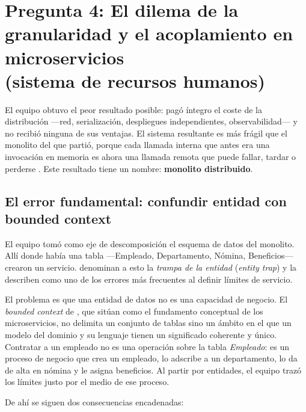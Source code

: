 \section[Pregunta 4: Granularidad y acoplamiento]{Pregunta 4: El dilema de la granularidad y el acoplamiento en microservicios\\(sistema de recursos humanos)}


El equipo obtuvo el peor resultado posible: pagó íntegro el coste de la distribución ---red, serialización, despliegues independientes, observabilidad--- y no recibió ninguna de sus ventajas. El sistema resultante es más frágil que el monolito del que partió, porque cada llamada interna que antes era una invocación en memoria es ahora una llamada remota que puede fallar, tardar o perderse \parencite{richardsford2020}. Este resultado tiene un nombre: \textbf{monolito distribuido}.

\subsection{El error fundamental: confundir entidad con bounded context}

El equipo tomó como eje de descomposición el esquema de datos del monolito. Allí donde había una tabla ---Empleado, Departamento, Nómina, Beneficios--- crearon un servicio. \textcite{fordhardparts2021} denominan a esto la \emph{trampa de la entidad} (\emph{entity trap}) y la describen como uno de los errores más frecuentes al definir límites de servicio.

El problema es que una entidad de datos no es una capacidad de negocio. El \emph{bounded context} de \textcite{evans2003}, que \textcite{richardsford2020} sitúan como el fundamento conceptual de los microservicios, no delimita un conjunto de tablas sino un ámbito en el que un modelo del dominio y su lenguaje tienen un significado coherente y único. Contratar a un empleado no es una operación sobre la tabla \emph{Empleado}: es un proceso de negocio que crea un empleado, lo adscribe a un departamento, lo da de alta en nómina y le asigna beneficios. Al partir por entidades, el equipo trazó los límites justo por el medio de ese proceso.

De ahí se siguen dos consecuencias encadenadas:

